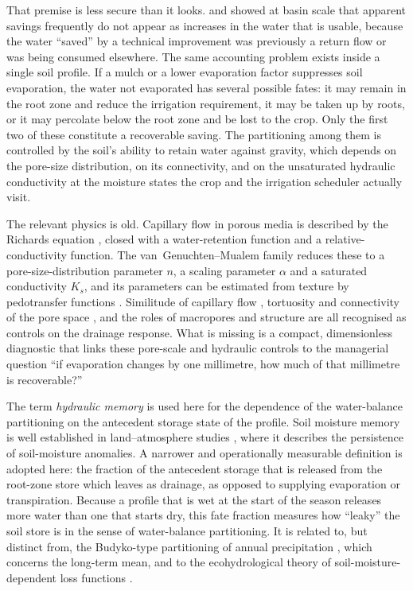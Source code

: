 That premise is less secure than it looks. \citet{Ward2008} and \citet{Grafton2018} showed at basin scale that apparent savings frequently do not appear as increases in the water that is usable, because the water ``saved'' by a technical improvement was previously a return flow or was being consumed elsewhere. The same accounting problem exists inside a single soil profile. If a mulch or a lower evaporation factor suppresses soil evaporation, the water not evaporated has several possible fates: it may remain in the root zone and reduce the irrigation requirement, it may be taken up by roots, or it may percolate below the root zone and be lost to the crop. Only the first two of these constitute a recoverable saving. The partitioning among them is controlled by the soil's ability to retain water against gravity, which depends on the pore-size distribution, on its connectivity, and on the unsaturated hydraulic conductivity at the moisture states the crop and the irrigation scheduler actually visit.

The relevant physics is old. Capillary flow in porous media is described by the Richards equation \citep{Richards1931}, closed with a water-retention function and a relative-conductivity function. The van~Genuchten--Mualem family \citep{vanGenuchten1980,Mualem1976} reduces these to a pore-size-distribution parameter $n$, a scaling parameter $\alpha$ and a saturated conductivity $K_s$, and its parameters can be estimated from texture by pedotransfer functions \citep{Schaap2001,Saxton2006,Weber2024}. Similitude of capillary flow \citep{Miller1956}, tortuosity and connectivity of the pore space \citep{Ghanbarian2013,Blunt2017}, and the roles of macropores and structure \citep{Beven1982,Beven2013,Jarvis2007,Strudley2008,Fatichi2020} are all recognised as controls on the drainage response. What is missing is a compact, dimensionless diagnostic that links these pore-scale and hydraulic controls to the managerial question ``if evaporation changes by one millimetre, how much of that millimetre is recoverable?''

The term \emph{hydraulic memory} is used here for the dependence of the water-balance partitioning on the antecedent storage state of the profile. Soil moisture memory is well established in land--atmosphere studies \citep{Koster2001,Koster2004,Entekhabi1996}, where it describes the persistence of soil-moisture anomalies. A narrower and operationally measurable definition is adopted here: the fraction of the antecedent storage that is released from the root-zone store which leaves as drainage, as opposed to supplying evaporation or transpiration. Because a profile that is wet at the start of the season releases more water than one that starts dry, this fate fraction measures how ``leaky'' the soil store is in the sense of water-balance partitioning. It is related to, but distinct from, the Budyko-type partitioning of annual precipitation \citep{Budyko1974,Milly1994,Zhang2001}, which concerns the long-term mean, and to the ecohydrological theory of soil-moisture-dependent loss functions \citep{Rodriguez2004}.

